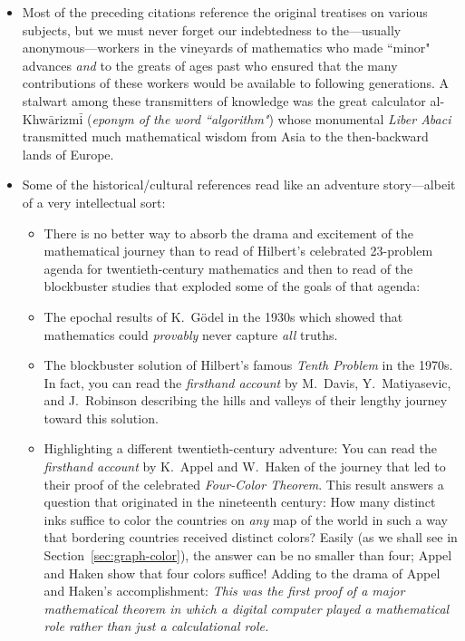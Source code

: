 \begin{description}
\begin{itemize}
\medskip\item
Most of the preceding citations reference the original treatises on various subjects, but we must never forget our indebtedness to the---usually anonymous---workers in the vineyards of mathematics who made ``minor" advances {\em and} to the greats of ages past who ensured that the many contributions of these workers would be available to following generations.  A stalwart among these transmitters of knowledge was the great calculator al-Khw$\bar{\mbox{a}}$rizm$\bar{\mbox{i}}$ ({\em eponym of the word ``algorithm"}) whose monumental {\it Liber Abaci} transmitted much mathematical wisdom from Asia to the then-backward lands of Europe.

\medskip\item
Some of the historical/cultural references read like an adventure story---albeit of a very intellectual sort:

\smallskip

   \begin{itemize}
   \item
There is no better way to absorb the drama and excitement of the mathematical journey than to read of Hilbert's celebrated 23-problem agenda for twentieth-century mathematics and then to read of the blockbuster studies that exploded some of the goals of that agenda:

   \medskip\item
The epochal results of K.~G\"{o}del in the 1930s which showed that mathematics could {\em provably} never capture {\em all} truths.

   \medskip\item
The blockbuster solution of Hilbert's famous {\em Tenth Problem} in the 1970s.  In fact, you can  read the {\em firsthand account} by M.~Davis, Y.~Matiyasevic, and J.~Robinson describing the hills and valleys of their lengthy journey toward this solution.

  \medskip\item
Highlighting a different twentieth-century adventure:  You can read the {\em firsthand account} by K.~Appel and W.~Haken of the journey that led to their proof of the celebrated {\em Four-Color Theorem}.  This result answers a question that originated in the nineteenth century: How many distinct inks suffice to color the countries on {\em any} map of the world in such a way that bordering countries received distinct colors?  Easily (as we shall see in Section~\ref{sec:graph-color}), the answer can be no smaller than four; Appel and Haken show that four colors suffice!  Adding to the drama of Appel and Haken's accomplishment:  {\em This was the first proof of a major mathematical theorem in which a digital computer played a {\em mathematical} role rather than just a {\em calculational} role.}
   \end{itemize}
\end{itemize}


\end{description}
